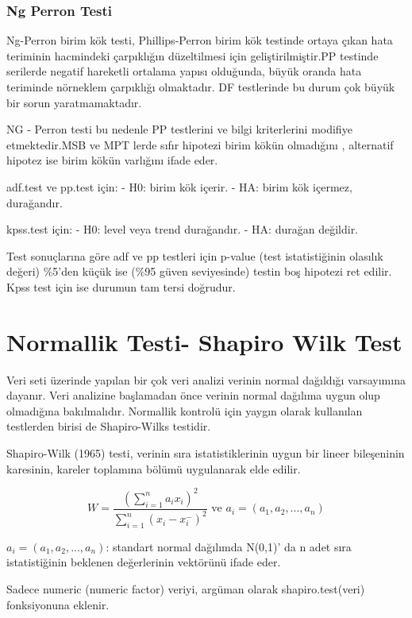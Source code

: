 \documentclass[11pt]{article}
\begin{document}
\subsubsection{Ng Perron Testi}\label{ng-perron-testi}

Ng-Perron birim kök testi, Phillips-Perron birim kök testinde ortaya
çıkan hata teriminin hacmindeki çarpıklığın düzeltilmesi için
geliştirilmiştir.PP testinde serilerde negatif hareketli ortalama yapısı
olduğunda, büyük oranda hata teriminde nörneklem çarpıklığı olmaktadır.
DF testlerinde bu durum çok büyük bir sorun yaratmamaktadır.

NG - Perron testi bu nedenle PP testlerini ve bilgi kriterlerini
modifiye etmektedir.MSB ve MPT lerde sıfır hipotezi birim kökün
olmadığını , alternatif hipotez ise birim kökün varlığını ifade eder.

adf.test ve pp.test için: - H0: birim kök içerir. - HA: birim kök
içermez, durağandır.

kpss.test için: - H0: level veya trend durağandır. - HA: durağan
değildir.

Test sonuçlarına göre adf ve pp testleri için p-value (test
istatistiğinin olasılık değeri) \%5'den küçük ise (\%95 güven
seviyesinde) testin boş hipotezi ret edilir. Kpss test için ise durumun
tam tersi doğrudur.

    \section{Normallik Testi- Shapiro Wilk
Test}\label{normallik-testi--shapiro-wilk-test}

Veri seti üzerinde yapılan bir çok veri analizi verinin normal dağıldığı
varsayımına dayanır. Veri analizine başlamadan önce verinin normal
dağılıma uygun olup olmadığına bakılmalıdır. Normallik kontrolü için
yaygın olarak kullanılan testlerden birisi de Shapiro-Wilks testidir.

Shapiro-Wilk (1965) testi, verinin sıra istatistiklerinin uygun bir
lineer bileşeninin karesinin, kareler toplamına bölümü uygulanarak elde
edilir.

\[  W = \frac{(\sum_{i=1}^n a_{i} x_{i})^2}{\sum_{i=1}^n (x_{i} - x^-_{i})^2 }  \text{ ve } a_{i}=(a_{1},a_{2},...,a_{n})   \]

\(a_{i}=(a_{1},a_{2},...,a_{n})\): standart normal dağılımda N(0,1)' da
n adet sıra istatistiğinin beklenen değerlerinin vektörünü ifade eder.

Sadece numeric (numeric factor) veriyi, argüman olarak
shapiro.test(veri) fonksiyonuna eklenir.
\end{document}
